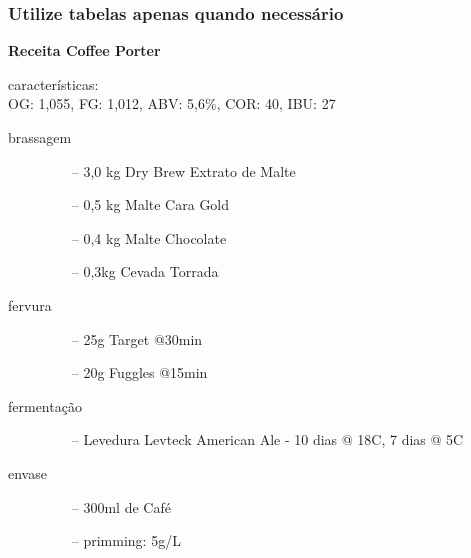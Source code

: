 \begin{frame}
\frametitle{Utilize tabelas apenas quando necessário}
\textbf{Receita Coffee Porter}

{\small características: \\OG: 1,055, FG: 1,012, ABV: 5,6\%, COR: 40, IBU: 27}
\begin{description}
\item[brassagem] 
	\begin{itemize}
	\item[--] 3,0 kg Dry Brew Extrato de Malte
	\item[--] 0,5 kg Malte Cara Gold
	\item[--] 0,4 kg Malte Chocolate
	\item[--] 0,3kg Cevada Torrada
	\end{itemize}
\item[fervura]
	\begin{itemize}
	\item[--] 25g Target @30min
	\item[--] 20g Fuggles @15min
	\end{itemize}
\item[fermentação]
	\begin{itemize}
	\item[--] Levedura Levteck American Ale - 10 dias @ 18C, 7 dias @ 5C
	\end{itemize}
\item[envase]
	\begin{itemize}
	\item[--] 300ml de Café
	\item[--] primming: 5g/L
	\end{itemize}
\end{description}
\end{frame}



